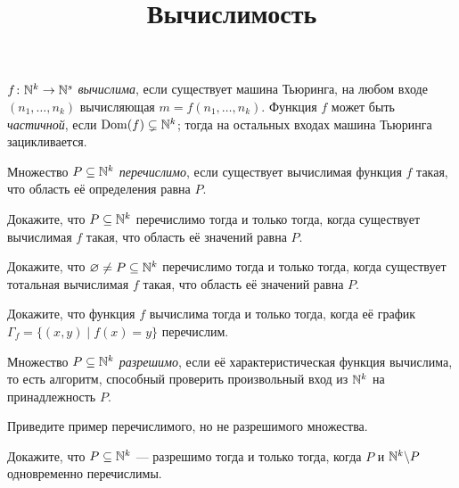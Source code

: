 \documentclass[a4paper, 12pt, num=Г0]{listok}
\DeclareMathOperator{\Dom}{Dom}
\begin{document}
\title{Вычислимость}
\maketitle
\begin{definition}
	$f \colon \mathbb{N}^k \to \mathbb{N}^s$ \textit{вычислима}, если существует машина Тьюринга,
	на любом входе $(n_1 , \dots, n_k)$ вычисляющая $m = f (n_1, \dots, n_k)$.
	Функция $f$ может быть \textit{частичной}, если $\Dom(f) \subsetneq \N^k$; тогда на остальных входах машина Тьюринга зацикливается.
\end{definition}
\begin{definition}
	Множество $P \subseteq \mathbb{N}^k$ \textit{перечислимо},
	если существует вычислимая функция $f$ такая, что область её определения равна $P$.
\end{definition}
\begin{problem}
	Докажите, что $P \subseteq \mathbb{N}^k$ перечислимо тогда и только тогда,
	когда существует вычислимая $f$ такая, что область её значений равна $P$.
\end{problem}
\begin{problem}
	Докажите, что $\varnothing \ne P \subseteq \mathbb{N}^k$ перечислимо тогда и только тогда,
	когда существует тотальная вычислимая $f$ такая, что область её значений равна $P$.
\end{problem}
\begin{problem}
	Докажите, что функция $f$ вычислима тогда и только тогда, когда
	её график $\Gamma_f = \{ (x, y) \mid f(x) = y \}$ перечислим.
\end{problem}
\begin{definition}
	Множество $P \subseteq \mathbb{N}^k$ \textit{разрешимо}, если её характеристическая функция вычислима,
	то есть алгоритм, способный проверить произвольный вход из $\mathbb{N}^k$ на принадлежность $P$.
\end{definition}
\begin{problem}
	Приведите пример перечислимого, но не разрешимого множества.
\end{problem}
\begin{problem}
	Докажите, что $P\subseteq \mathbb{N}^k$ --- разрешимо тогда и только тогда, когда $P$ и $\mathbb{N}^k \backslash P$ одновременно перечислимы.
\end{problem}
\end{document}
